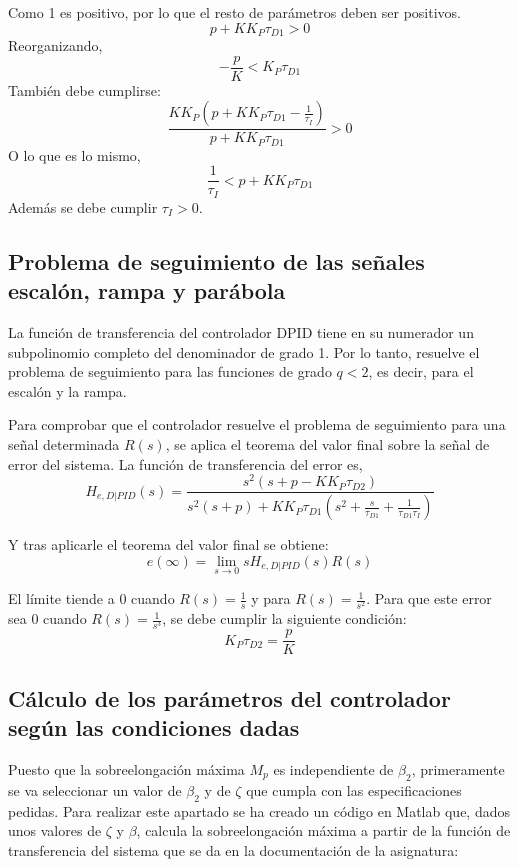 \documentclass[a4paper]{article}
\begin{document}
Como 1 es positivo, por lo que el resto de parámetros deben ser positivos.
\begin{equation}
	p+K K_P \tau_{D1}>0
\end{equation}
Reorganizando,
\begin{equation}
	-\frac{p}{K}<K_P \tau_{D1}
	\label{eq:2}
\end{equation}
También debe cumplirse:
\begin{equation}
	\frac{K K_P (p+K K_P \tau_{D1} -\frac{1}{\tau_I})}{p+K K_P \tau_{D1}} > 0
\end{equation}
O lo que es lo mismo,
\begin{equation}
	\frac{1}{\tau_I} < p+K K_P \tau_{D1}
	\label{eq:3}
\end{equation}
Además se debe cumplir $\tau_I > 0$.

\subsection{Problema de seguimiento de las señales escalón, rampa y parábola}
La función de transferencia del controlador D\textbar PID tiene en su numerador un subpolinomio completo del denominador de grado 1. Por lo tanto, resuelve el problema de seguimiento para las funciones de grado $q<2$, es decir, para el escalón y la rampa.

Para comprobar que el controlador resuelve el problema de seguimiento para una señal determinada $R(s)$, se aplica el teorema del valor final sobre la señal de error del sistema.
La función de transferencia del error es,
\begin{equation}
	H_{e, D|PID}(s)=\frac{s^2(s+p-K K_P \tau_{D2})}{s^2(s+p)+K K_P \tau_{D1}(s^2+\frac{s}{\tau_{D1}}+\frac{1}{\tau_{D1} \tau_I})}
\end{equation}

Y tras aplicarle el teorema del valor final se obtiene:
\begin{equation}
	e(\infty)=\lim_{s \rightarrow 0}
	s H_{e, D|PID}(s) R(s)
\end{equation}

El límite tiende a 0 cuando $R(s)=\frac{1}{s}$ y para $R(s)=\frac{1}{s^2}$. Para que este error sea $0$ cuando $R(s)=\frac{1}{s^3}$, se debe cumplir la siguiente condición:
\begin{equation}
K_P \tau_{D2} = \frac{p}{K}
\end{equation}

\subsection{Cálculo de los parámetros del controlador según las condiciones dadas}
Puesto que la sobreelongación máxima $M_p$ es independiente de $\beta_2$, primeramente se va seleccionar un valor de $\beta_2$ y de $\zeta$ que cumpla con las especificaciones pedidas.
Para realizar este apartado se ha creado un código en Matlab que, dados unos valores de $\zeta$ y $\beta$, calcula la sobreelongación máxima a partir de la función de transferencia del sistema que se da en la documentación de la asignatura:
\end{document}
